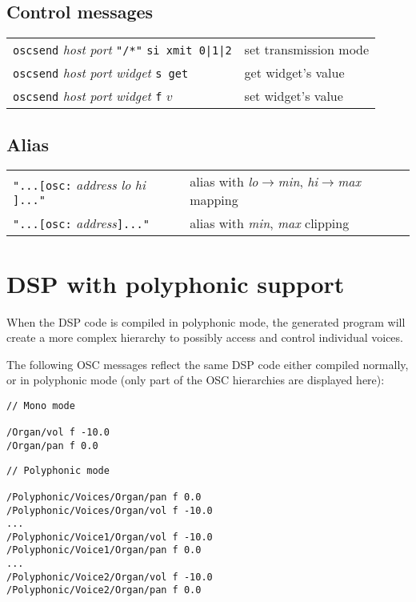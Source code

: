 \subsection*{Control messages}

\begin{tabular}{ll}
\lstinline'oscsend' \emph{host} \emph{port} \lstinline'"/*"' \lstinline'si xmit 0|1|2' & set transmission mode \\
\lstinline'oscsend' \emph{host} \emph{port} \emph{widget} \lstinline's get' & get widget's value \\
\lstinline'oscsend' \emph{host} \emph{port} \emph{widget} \lstinline'f' $v$ & set widget's value
\end{tabular}

\subsection*{Alias}

\begin{tabular}{ll}
\lstinline'"...[osc:' \emph{address}  \emph{lo}  \emph{hi} \lstinline']..."' & alias with \emph{lo}$\rightarrow$\emph{min}, \emph{hi}$\rightarrow$\emph{max} mapping\\
\lstinline'"...[osc:' \emph{address}\lstinline']..."' & alias with \emph{min}, \emph{max} clipping
\end{tabular}

\section{DSP with polyphonic support}

When the DSP code is compiled in polyphonic mode, the generated program will create a more complex hierarchy to possibly access and control individual voices.

The following OSC messages reflect the same DSP code either compiled normally, or in polyphonic mode (only part of the OSC hierarchies are displayed here):

\begin{lstlisting}
// Mono mode

/Organ/vol f -10.0
/Organ/pan f 0.0
\end{lstlisting}

\begin{lstlisting}
// Polyphonic mode

/Polyphonic/Voices/Organ/pan f 0.0
/Polyphonic/Voices/Organ/vol f -10.0
...
/Polyphonic/Voice1/Organ/vol f -10.0
/Polyphonic/Voice1/Organ/pan f 0.0
...
/Polyphonic/Voice2/Organ/vol f -10.0
/Polyphonic/Voice2/Organ/pan f 0.0
\end{lstlisting}

